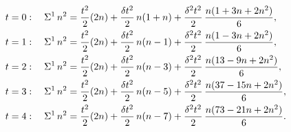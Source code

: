 \begin{example} 
  \begin{align*}
    t=0:\quad
    \Sigma^{1}\,{n}^{2}
    &=
    \frac{t^2}{2}(2n)
    +
    \frac{\delta t^2}{2}\, n(1+n)
    +
    \frac{\delta^2 t^2}{2}\,\frac{n(1+3n+2n^2)}{6},
    \\
    t=1:\quad
    \Sigma^{1}\,{n}^{2}
    &=
    \frac{t^2}{2}(2n)
    +
    \frac{\delta t^2}{2}\, n(n-1)
    +
    \frac{\delta^2 t^2}{2}\,\frac{n(1-3n+2n^2)}{6},
    \\
    t=2:\quad
    \Sigma^{1}\,{n}^{2}
    &=
    \frac{t^2}{2}(2n)
    +
    \frac{\delta t^2}{2}\, n(n-3)
    +
    \frac{\delta^2 t^2}{2}\,\frac{n(13-9n+2n^2)}{6},
    \\
    t=3:\quad
    \Sigma^{1}\,{n}^{2}
    &=
    \frac{t^2}{2}(2n)
    +
    \frac{\delta t^2}{2}\, n(n-5)
    +
    \frac{\delta^2 t^2}{2}\,\frac{n(37-15n+2n^2)}{6},
    \\
    t=4:\quad
    \Sigma^{1}\,{n}^{2}
    &=
    \frac{t^2}{2}(2n)
    +
    \frac{\delta t^2}{2}\, n(n-7)
    +
    \frac{\delta^2 t^2}{2}\,\frac{n(73-21n+2n^2)}{6}.
  \end{align*}
\end{example}
